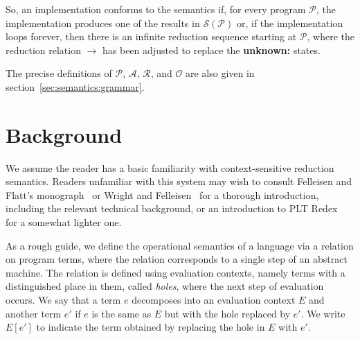 So, an implementation conforms to the semantics if, for every program $\mathcal{P}$, the implementation produces one of the results in $\mathcal{S}(\mathcal{P})$ or, if the implementation loops forever, then there is an infinite reduction sequence starting at $\mathcal{P}$, where the reduction relation $\rightarrow$ has been adjusted to replace the \textbf{unknown:} states.

The precise definitions of $\mathcal{P}$, $\mathcal{A}$, $\mathcal{R}$, and $\mathscr{O}$ are also given in section~\ref{sec:semantics:grammar}.

\section{Background}

We assume the reader has a basic familiarity with context-sensitive
reduction semantics. Readers unfamiliar with this system may wish to
consult Felleisen and Flatt's monograph~\cite{ff:monograph} or Wright
and Felleisen~\cite{wf:type-soundness} for a thorough introduction,
including the relevant technical background, or an introduction to PLT
Redex~\cite{mfff:plt-redex} for a somewhat lighter one.

As a rough guide, we define the operational semantics of a language
via a relation on program terms, where the relation corresponds to a
single step of an abstract machine. The relation is defined using
evaluation contexts, namely terms with a distinguished place in them,
called \emph{holes}, where the next step of evaluation
occurs. We say that a term $e$ decomposes into an evaluation
context $E$ and another term $e'$ if $e$ is the
same as $E$ but with the hole replaced by $e'$. We write
$E[e']$ to indicate the term obtained by replacing the hole in
$E$ with $e'$.

